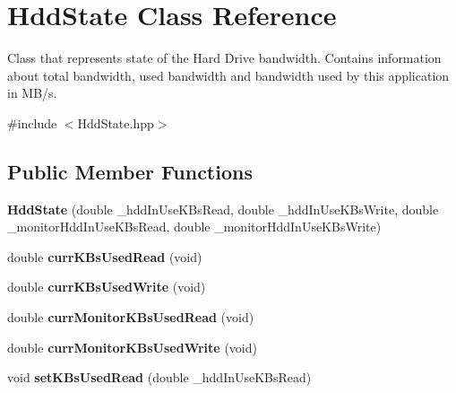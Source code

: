 \hypertarget{classHddState}{}\section{Hdd\+State Class Reference}
\label{classHddState}


Class that represents state of the Hard Drive bandwidth. Contains information about total bandwidth, used bandwidth and bandwidth used by this application in M\+B/s.  




{\ttfamily \#include $<$Hdd\+State.\+hpp$>$}

\subsection*{Public Member Functions}
\begin{DoxyCompactItemize}
\item 
{\bfseries Hdd\+State} (double \+\_\+hdd\+In\+Use\+K\+Bs\+Read, double \+\_\+hdd\+In\+Use\+K\+Bs\+Write, double \+\_\+monitor\+Hdd\+In\+Use\+K\+Bs\+Read, double \+\_\+monitor\+Hdd\+In\+Use\+K\+Bs\+Write)\hypertarget{classHddState_a8f0a4f976c42a689c31aa8f3c750b9d4}{}\label{classHddState_a8f0a4f976c42a689c31aa8f3c750b9d4}

\item 
double {\bfseries curr\+K\+Bs\+Used\+Read} (void)\hypertarget{classHddState_a48b849ce238b6e830169e39d81ebd2f8}{}\label{classHddState_a48b849ce238b6e830169e39d81ebd2f8}

\item 
double {\bfseries curr\+K\+Bs\+Used\+Write} (void)\hypertarget{classHddState_a015826def238b010da1413939ff3ea1e}{}\label{classHddState_a015826def238b010da1413939ff3ea1e}

\item 
double {\bfseries curr\+Monitor\+K\+Bs\+Used\+Read} (void)\hypertarget{classHddState_ab0b8b045d72b8bd8aa1c68dc845f5350}{}\label{classHddState_ab0b8b045d72b8bd8aa1c68dc845f5350}

\item 
double {\bfseries curr\+Monitor\+K\+Bs\+Used\+Write} (void)\hypertarget{classHddState_a9fba13f44b261b2cf5a69be3746c6857}{}\label{classHddState_a9fba13f44b261b2cf5a69be3746c6857}

\item 
void {\bfseries set\+K\+Bs\+Used\+Read} (double \+\_\+hdd\+In\+Use\+K\+Bs\+Read)\hypertarget{classHddState_a9f8612decc9f2bccd016289af5f3b682}{}\label{classHddState_a9f8612decc9f2bccd016289af5f3b682}


\end{DoxyCompactItemize}
